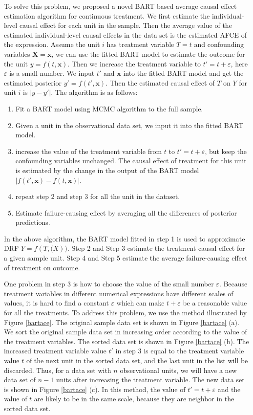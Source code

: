 To solve this problem, we proposed a novel BART based average causal effect estimation algorithm for continuous treatment. We first estimate the individual-level causal effect for  each unit in the sample. Then the average value of the estimated individual-level causal effects in the data set is the estimated AFCE of the expression.  Assume the unit $i$ has treatment variable $T=t$ and confounding variables $\pmb {X}=\pmb {x}$, we can use the fitted BART model to estimate the outcome for the unit $y=f(t,\pmb{x})$. Then we increase the treatment variable to $t'=t+\varepsilon$, here $\varepsilon $ is a small number. We input $t'$ and $\pmb{x}$ into the fitted BART model and get the estimated posterior $y'=f(t',\pmb{x})$. Then the estimated causal effect of $T$ on $Y$ for unit $i$ is $\left| {y - y'} \right|$. The algorithm is as follows:
\begin{enumerate}
\item Fit a BART model using MCMC algorithm to the full sample.
\item Given a unit in the observational data set, we input it into the fitted BART model. 
\item increase the value of the treatment variable from $t$ to $t'=t+\varepsilon$, but keep the confounding variables unchanged. The causal effect of treatment for this unit is estimated by the change in the output of the BART model $|f(t',\pmb{x})-f(t,\pmb{x})|$.
\item repeat step 2 and step 3 for all the unit in the dataset.
\item Estimate failure-causing effect by averaging all the differences of posterior predictions.
\end{enumerate}

In the above algorithm, the BART model fitted in step 1 is used to approximate DRF $Y=f(T,\pmb(X))$. Step 2 and Step 3 estimate the treatment causal effect for a given sample unit. Step 4 and Step 5 estimate the average failure-causing effect of treatment on outcome.

One problem in step 3 is how to choose the value of the small number $\varepsilon $. Because treatment variables in different numerical expressions have different scales of values, it is hard to find a constant $\varepsilon$ which can make $t+\varepsilon$ be a reasonable value for all the treatments. To address this problem, we use the method illustrated by Figure \ref{bartace}.  The original sample data set is shown in Figure \ref{bartace} (a).  We sort the original sample data set in increasing order according to the value of the treatment variables. The sorted data set is shown in Figure \ref{bartace} (b). The increased treatment variable value $t'$ in step 3 is equal to the treatment variable value $t$ of the next unit in the sorted data set, and the last unit in the list will be discarded. Thus,  for a data set with $n$ observational units, we will have a new data set of $n-1$ units after increasing the treatment variable. The new data set is shown in Figure \ref{bartace} (c). In this method, the value of $t'=t+\varepsilon$ and the value of $t$ are likely to be in the same scale, because they are neighbor in the sorted data set. 

